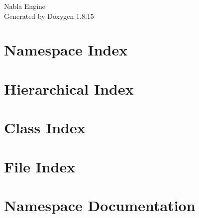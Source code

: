 \let\mypdfximage\pdfximage\def\pdfximage{\immediate\mypdfximage}\documentclass[twoside]{book}
\newcommand{\+}{\discretionary{\mbox{\scriptsize$\hookleftarrow$}}{}{}}
\newcommand{\clearemptydoublepage}{%
  \newpage{\pagestyle{empty}\cleardoublepage}%
}
\begin{document}
\hypersetup{pageanchor=false,
             bookmarksnumbered=true,
             pdfencoding=unicode
            }
\begin{titlepage}
\vspace*{7cm}
\begin{center}%
{\Large Nabla Engine }\\
\vspace*{1cm}
{\large Generated by Doxygen 1.8.15}\\
\end{center}
\end{titlepage}
\clearemptydoublepage
{}
\tableofcontents
\clearemptydoublepage
{}
\hypersetup{pageanchor=true}

\chapter{Namespace Index}

\chapter{Hierarchical Index}

\chapter{Class Index}

\chapter{File Index}

\chapter{Namespace Documentation}




\end{document}
